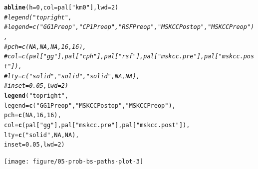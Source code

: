 \documentclass{article}\usepackage[]{graphicx}\usepackage[]{color}
\makeatletter
\newcommand{\hlnum}[1]{\textcolor[rgb]{0.686,0.059,0.569}{#1}}%
\newcommand{\hlstr}[1]{\textcolor[rgb]{0.192,0.494,0.8}{#1}}%
\newcommand{\hlcom}[1]{\textcolor[rgb]{0.678,0.584,0.686}{\textit{#1}}}%
\newcommand{\hlstd}[1]{\textcolor[rgb]{0.345,0.345,0.345}{#1}}%
\newcommand{\hlkwc}[1]{\textcolor[rgb]{0.333,0.667,0.333}{#1}}%
\newcommand{\hlkwd}[1]{\textcolor[rgb]{0.737,0.353,0.396}{\textbf{#1}}}%
\newenvironment{kframe}{%
 \def\at@end@of@kframe{}%
 \ifinner\ifhmode%
  \def\at@end@of@kframe{\end{minipage}}%
  \begin{minipage}{\columnwidth}%
 \fi\fi%
 \def\FrameCommand##1{\hskip\@totalleftmargin \hskip-\fboxsep
 \colorbox{shadecolor}{##1}\hskip-\fboxsep
     \hskip-\linewidth \hskip-\@totalleftmargin \hskip\columnwidth}%
 \MakeFramed {\advance\hsize-\width
   \@totalleftmargin\z@ \linewidth\hsize
   \@setminipage}}%
 {\par\unskip\endMakeFramed%
 \at@end@of@kframe}
\newenvironment{knitrout}{}{} %
\makeatother
\begin{document}
\begin{knitrout}
\begin{kframe}
\begin{alltt}
\hlkwd{abline}\hlstd{(}\hlkwc{h} \hlstd{=} \hlnum{0}\hlstd{,} \hlkwc{col} \hlstd{= pal[}\hlstr{"km0"}\hlstd{],} \hlkwc{lwd} \hlstd{=} \hlnum{2}\hlstd{)}
\hlcom{# legend("topright", }
\hlcom{# 	legend = c(	"GG1 Preop", 	"CP1 Preop", 	"RSF Preop", 	"MSKCC Postop", 	"MSKCC Preop"), }
\hlcom{# 	pch = c(	NA, 			NA, 			NA, 			16, 				16), }
\hlcom{# 	col = c(	pal["gg"], 		pal["cph"], 	pal["rsf"], 	pal["mskcc.pre"], 	pal["mskcc.post"]), }
\hlcom{# 	lty = c(	"solid", 		"solid", 		"solid", 		NA, 				NA), }
\hlcom{# 	inset = 0.05, lwd = 2)}
\hlkwd{legend}\hlstd{(}\hlstr{"topright"}\hlstd{,}
        \hlkwc{legend} \hlstd{=} \hlkwd{c}\hlstd{(}     \hlstr{"GG1 Preop"}\hlstd{,}    \hlstr{"MSKCC Postop"}\hlstd{,}         \hlstr{"MSKCC Preop"}\hlstd{),}
        \hlkwc{pch} \hlstd{=} \hlkwd{c}\hlstd{(}        \hlnum{NA}\hlstd{,}                     \hlnum{16}\hlstd{,}                             \hlnum{16}\hlstd{),}
        \hlkwc{col} \hlstd{=} \hlkwd{c}\hlstd{(        pal[}\hlstr{"gg"}\hlstd{],              pal[}\hlstr{"mskcc.pre"}\hlstd{],       pal[}\hlstr{"mskcc.post"}\hlstd{]),}
        \hlkwc{lty} \hlstd{=} \hlkwd{c}\hlstd{(}        \hlstr{"solid"}\hlstd{,}                \hlnum{NA}\hlstd{,}                             \hlnum{NA}\hlstd{),}
        \hlkwc{inset} \hlstd{=} \hlnum{0.05}\hlstd{,} \hlkwc{lwd} \hlstd{=} \hlnum{2}\hlstd{)}
\end{alltt}
\end{kframe}

{\centering \texttt{[image: figure/05-prob-bs-paths-plot-3]} 

}



\end{knitrout}
\end{document}
